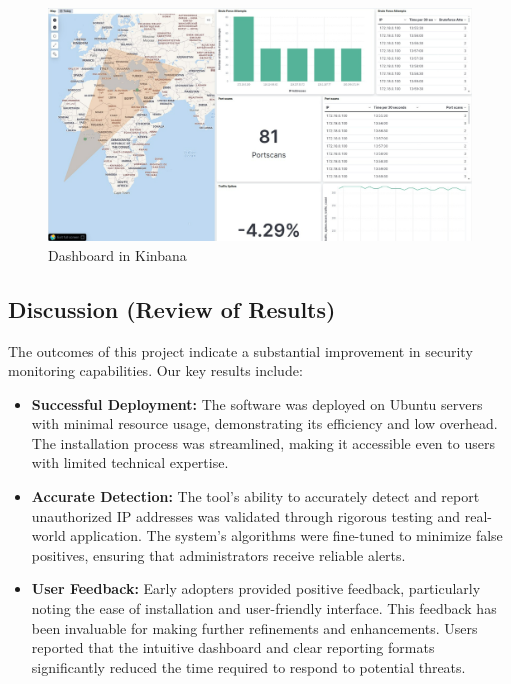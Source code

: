 \documentclass{article}
\begin{document}
    \begin{figure}[H]
        \centering
        \includegraphics[width=\textwidth]{./images/dashboard.png}
        \caption{Dashboard in Kinbana}\label{fig:dashboard}
    \end{figure}

    \newpage
    \subsection{Discussion (Review of Results)}\label{subsec:discussion-(review-of-results)}
    The outcomes of this project indicate a substantial improvement in security monitoring capabilities.
    Our key results include:

    \begin{itemize}
        \item \textbf{Successful Deployment:} The software was deployed on Ubuntu servers with minimal resource usage, demonstrating its efficiency and low overhead.
        The installation process was streamlined, making it accessible even to users with limited technical expertise.
        \item \textbf{Accurate Detection:} The tool's ability to accurately detect and report unauthorized IP addresses was validated through rigorous testing and real-world application.
        The system's algorithms were fine-tuned to minimize false positives, ensuring that administrators receive reliable alerts.
        \item \textbf{User Feedback:} Early adopters provided positive feedback, particularly noting the ease of installation and user-friendly interface.
        This feedback has been invaluable for making further refinements and enhancements.
        Users reported that the intuitive dashboard and clear reporting formats significantly reduced the time required to respond to potential threats.
    \end{itemize}
\end{document}
